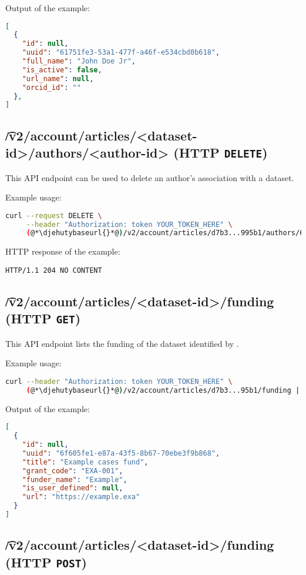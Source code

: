   Output of the example:
\begin{lstlisting}[language=JSON]
[
  {
    "id": null,
    "uuid": "61751fe3-53a1-477f-a46f-e534cbd0b618",
    "full_name": "John Doe Jr",
    "is_active": false,
    "url_name": null,
    "orcid_id": ""
  },
]
\end{lstlisting}

\subsection{\t{/v2/account/articles/<dataset-id>/authors/<author-id>} (HTTP \texttt{DELETE})}

  This API endpoint can be used to delete an author's association with a dataset.

  Example usage:
\begin{lstlisting}[language=bash]
curl --request DELETE \
     --header "Authorization: token YOUR_TOKEN_HERE" \
     (@*\djehutybaseurl{}*@)/v2/account/articles/d7b3...995b1/authors/6175...0b618
\end{lstlisting}

  HTTP response of the example:
\begin{lstlisting}
HTTP/1.1 204 NO CONTENT
\end{lstlisting}

\subsection{\t{/v2/account/articles/<dataset-id>/funding} (HTTP \texttt{GET})}

  This API endpoint lists the funding of the dataset identified by .

  Example usage:
\begin{lstlisting}[language=bash]
curl --header "Authorization: token YOUR_TOKEN_HERE" \
     (@*\djehutybaseurl{}*@)/v2/account/articles/d7b3...95b1/funding | jq
\end{lstlisting}

  Output of the example:
\begin{lstlisting}[language=JSON]
[
  {
    "id": null,
    "uuid": "6f605fe1-e87a-43f5-8b67-70ebe3f9b868",
    "title": "Example cases fund",
    "grant_code": "EXA-001",
    "funder_name": "Example",
    "is_user_defined": null,
    "url": "https://example.exa"
  }
]
\end{lstlisting}

\subsection{\t{/v2/account/articles/<dataset-id>/funding} (HTTP \texttt{POST})}
\label{sec:api-v2-articles-funding-post}

